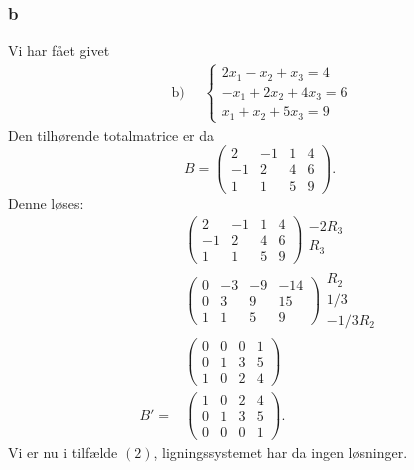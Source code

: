 		\subsubsection{b}

		Vi har fået givet 
			\begin{align*}
				\text { b) } \quad\left\{\begin{array}{r}{2 x_{1}-x_{2}+x_{3}=4} \\ {-x_{1}+2 x_{2}+4 x_{3}=6} \\ {x_{1}+x_{2}+5 x_{3}=9}\end{array}\right.
			\end{align*}
		Den tilhørende totalmatrice er da
			\begin{equation}
				B=\left(\begin{array}{rrr|r} {2} & {-1} & {1} & {4} \\ {-1} & {2} & {4} & {6} \\ {1} & {1} & {5} & {9} \end{array}\right).
			\end{equation}
		Denne løses:
			\begin{align*}
				&\left(\begin{array}{rrr|r} {2} & {-1} & {1} & {4} \\ {-1} & {2} & {4} & {6} \\ {1} & {1} & {5} & {9} \end{array}\right) \begin{array}{c} -2R_3 \\ R_3 \\ \, \end{array}\\
				&\left(\begin{array}{rrr|r} {0} & {-3} & {-9} & {-14} \\ {0} & {3} & {9} & {15} \\ {1} & {1} & {5} & {9} \end{array}\right) \begin{array}{c} R_2 \\ 1/3 \\ -1/3R_2 \end{array}\\
				&\left(\begin{array}{rrr|r} {0} & {0} & {0} & {1} \\ {0} & {1} & {3} & {5} \\ {1} & {0} & {2} & {4} \end{array}\right)\\
				B'=&\left(\begin{array}{rrr|r}  {1} & {0} & {2} & {4} \\ {0} & {1} & {3} & {5} \\ {0} & {0} & {0} & {1} \end{array}\right).
			\end{align*}
		Vi er nu i tilfælde $(2)$, ligningssystemet har da ingen løsninger.

